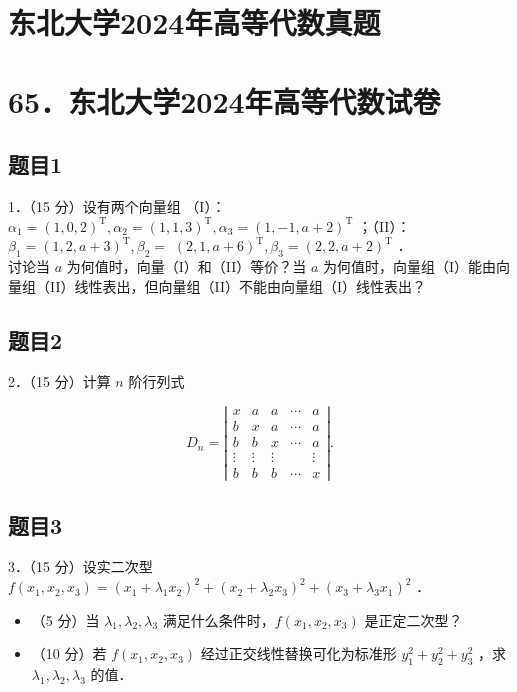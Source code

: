\documentclass{article}
\begin{document}
\section*{东北大学2024年高等代数真题}
\section*{65．东北大学2024年高等代数试卷}

\subsection{题目1}
1．（15 分）设有两个向量组 （I）：\(\alpha_{1}=(1,0,2)^{\mathrm{T}}, \alpha_{2}=(1,1,3)^{\mathrm{T}}, \alpha_{3}=(1,-1, a+2)^{\mathrm{T}}\) ；（II）：\(\beta_{1}=(1,2, a+3)^{\mathrm{T}}, \beta_{2}=\) \((2,1, a+6)^{\mathrm{T}}, \beta_{3}=(2,2, a+2)^{\mathrm{T}}\) ．\\
讨论当 \(a\) 为何值时，向量（I）和（II）等价？当 \(a\) 为何值时，向量组（I）能由向量组（II）线性表出，但向量组（II）不能由向量组（I）线性表出？

\subsection{题目2}
2．（15 分）计算 \(n\) 阶行列式

\[
D_{n}=\left|\begin{array}{ccccc}
x & a & a & \cdots & a \\
b & x & a & \cdots & a \\
b & b & x & \cdots & a \\
\vdots & \vdots & \vdots & & \vdots \\
b & b & b & \cdots & x
\end{array}\right| .
\]

\subsection{题目3}
3．（15 分）设实二次型 \(f\left(x_{1}, x_{2}, x_{3}\right)=\left(x_{1}+\lambda_{1} x_{2}\right)^{2}+\left(x_{2}+\lambda_{2} x_{3}\right)^{2}+\left(x_{3}+\lambda_{3} x_{1}\right)^{2}\) ．

\begin{itemize}
  \item[（1）] （5 分）当 \(\lambda_{1}, \lambda_{2}, \lambda_{3}\) 满足什么条件时，\(f\left(x_{1}, x_{2}, x_{3}\right)\) 是正定二次型？
  \item[（2）] （10 分）若 \(f\left(x_{1}, x_{2}, x_{3}\right)\) 经过正交线性替换可化为标准形 \(y_{1}^{2}+y_{2}^{2}+y_{3}^{2}\) ，求 \(\lambda_{1}, \lambda_{2}, \lambda_{3}\) 的值．
\end{itemize}
\end{document}
